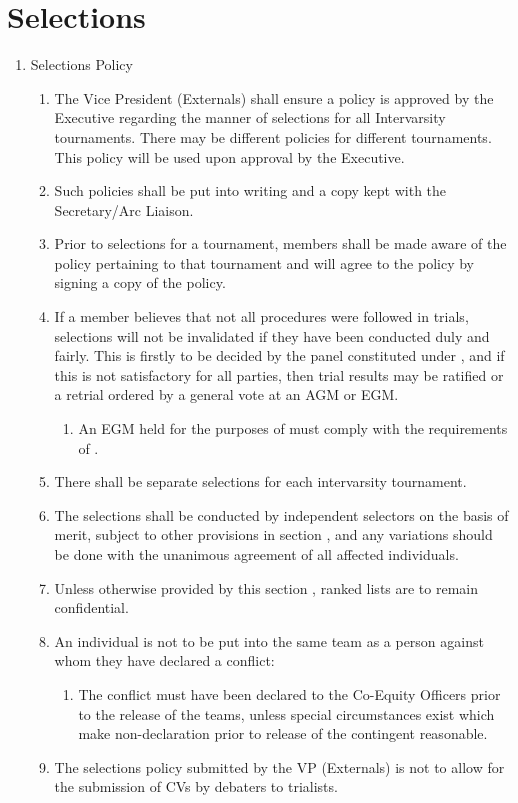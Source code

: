 \newpage
\section{Selections} \label{selections_section}

\begin{enumerate}
\item Selections Policy
  \begin{enumerate}
  \item The Vice President (Externals) shall ensure a policy is approved by the Executive regarding the manner of selections for all Intervarsity tournaments. There may be different policies for different tournaments. This policy will be used upon approval by the Executive.
  \item Such policies shall be put into writing and a copy kept with the Secretary/Arc Liaison.
  \item Prior to selections for a tournament, members shall be made aware of the policy pertaining to that tournament and will agree to the policy by signing a copy of the policy.
  \item If a member believes that not all procedures were followed in trials, selections will not be invalidated if they have been conducted duly and fairly. This is firstly to be decided by the panel constituted under , and if this is not satisfactory for all parties, then trial results may be ratified or a retrial ordered by a general vote at an AGM or EGM. \label{improper_trial_resolution}
    \begin{enumerate}
    \item An EGM held for the purposes of  must comply with the requirements of .
    \end{enumerate}
  \item There shall be separate selections for each intervarsity tournament.
  \item The selections shall be conducted by independent selectors on the basis of merit, subject to other provisions in section , and any variations should be done with the unanimous agreement of all affected individuals.
  \item Unless otherwise provided by this section , ranked lists are to remain confidential.
  \item An individual is not to be put into the same team as a person against whom they have declared a conflict:
    \begin{enumerate}
    \item The conflict must have been declared to the Co-Equity Officers prior to the release of the teams, unless special circumstances exist which make non-declaration prior to release of the contingent reasonable.
    \end{enumerate}
  \item The selections policy submitted by the VP (Externals) is not to allow for the submission of CVs by debaters to trialists.
  \end{enumerate}


\end{enumerate}
